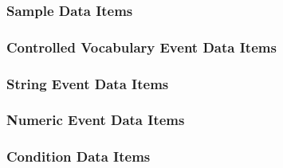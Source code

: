 \subsubsection{Sample Data Items}

\subsubsection{Controlled Vocabulary Event Data Items}

\subsubsection{String Event Data Items}

\subsubsection{Numeric Event Data Items}

\subsubsection{Condition Data Items}
